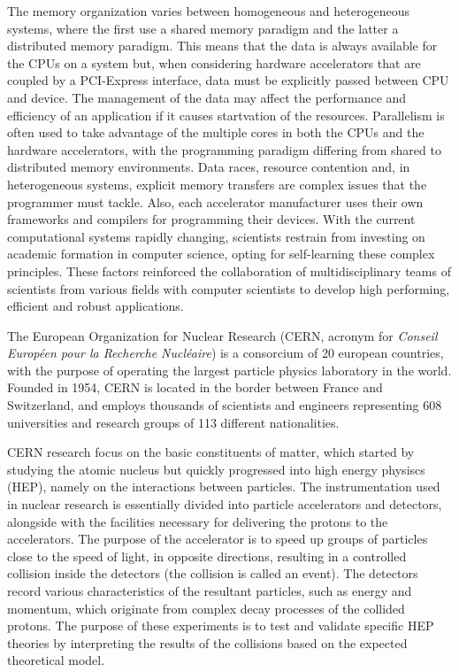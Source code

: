The memory organization varies between homogeneous and heterogeneous systems, where the first use a shared memory paradigm and the latter a distributed memory paradigm. This means that the data is always available for the CPUs on a system but, when considering hardware accelerators that are coupled by a PCI-Express interface, data must be explicitly passed between CPU and device. The management of the data may affect the performance and efficiency of an application if it causes startvation of the resources. Parallelism is often used to take advantage of the multiple cores in both the CPUs and the hardware accelerators, with the programming paradigm differing from shared to distributed memory environments. Data races, resource contention and, in heterogeneous systems, explicit memory transfers are complex issues that the programmer must tackle. Also, each accelerator manufacturer uses their own frameworks and compilers for programming their devices. With the current computational systems rapidly changing, scientists restrain from investing on academic formation in computer science, opting for self-learning these complex principles. These factors reinforced the collaboration of multidisciplinary teams of scientists from various fields with computer scientists to develop high performing, efficient and robust applications.

The European Organization for Nuclear Research \cite{CERN} (CERN, acronym for \textit{Conseil Européen pour la Recherche Nucléaire}) is a consorcium of 20 european countries, with the purpose of operating the largest particle physics laboratory in the world. Founded in 1954, CERN is located in the border between France and Switzerland, and employs thousands of scientists and engineers representing 608 universities and research groups of 113 different nationalities.

CERN research focus on the basic constituents of matter, which started by studying the atomic nucleus but quickly progressed into high energy physiscs (HEP), namely on the interactions between particles. The instrumentation used in nuclear research is essentially divided into particle accelerators and detectors, alongside with the facilities necessary for delivering the protons to the accelerators. The purpose of the accelerator is to speed up groups of particles close to the speed of light, in opposite directions, resulting in a controlled collision inside the detectors (the collision is called an event). The detectors record various characteristics of the resultant particles, such as energy and momentum, which originate from complex decay processes of the collided protons. The purpose of these experiments is to test and validate specific HEP theories by interpreting the results of the collisions based on the expected theoretical model.


